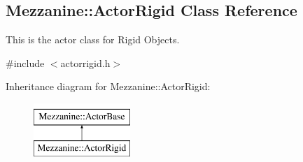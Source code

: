 \hypertarget{classMezzanine_1_1ActorRigid}{
\subsection{Mezzanine::ActorRigid Class Reference}
\label{classMezzanine_1_1ActorRigid}
}


This is the actor class for Rigid Objects.  




{\ttfamily \#include $<$actorrigid.h$>$}

Inheritance diagram for Mezzanine::ActorRigid:\begin{figure}[H]
\begin{center}
\leavevmode
\includegraphics[height=2.000000cm]{classMezzanine_1_1ActorRigid}
\end{center}
\end{figure}

